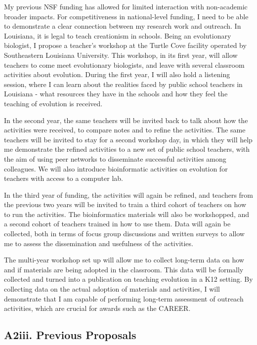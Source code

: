 \documentclass[12pt]{article}
\begin{document}
My previous NSF funding has allowed for limited interaction with non-academic broader impacts.
For competitiveness in national-level funding, I need to be able to demonstrate a clear connection between my research work and outreach.
In Louisiana, it is legal to teach creationism in schools.
Being an evolutionary biologist, I propose a teacher's workshop at the Turtle Cove facility operated by Southeastern Louisiana University.
This workshop, in its first year, will allow teachers to come meet evolutionary biologists, and leave with several classroom activities about evolution.
During the first year, I will also hold a listening session, where I can learn about the realities faced by public school teachers in Louisiana - what resources they have in the schools and how they feel the teaching of evolution is received. \par
In the second year, the same teachers will be invited back to talk about how the activities were received, to compare notes and to refine the activities. 
The same teachers will be invited to stay for a second workshop day, in which they will help me demonstrate the refined activities to a new set of public school teachers, with the aim of using peer networks to disseminate successful activities among colleagues.
We will also introduce bioinformatic activities on evolution for teachers with access to a computer lab. \par
In the third year of funding, the activities will again be refined, and teachers from the previous two years will be invited to train a third cohort of teachers on how to run the activities.
The bioinformatics materials will also be workshopped, and a second cohort of teachers trained in how to use them.
Data will again be collected, both in terms of focus group discussions and written surveys to allow me to assess the dissemination and usefulness of the activities. \par
The multi-year workshop set up will allow me to collect long-term data on how and if materials are being adopted in the classroom.
This data will be formally collected and turned into a publication on teaching evolution in a K12 setting.
By collecting data on the actual adoption of materials and activities, I will demonstrate that I am capable of performing long-term assessment of outreach activities, which are crucial for awards such as the CAREER. 
\par

\subsection*{A2iii. Previous Proposals}
\end{document}
